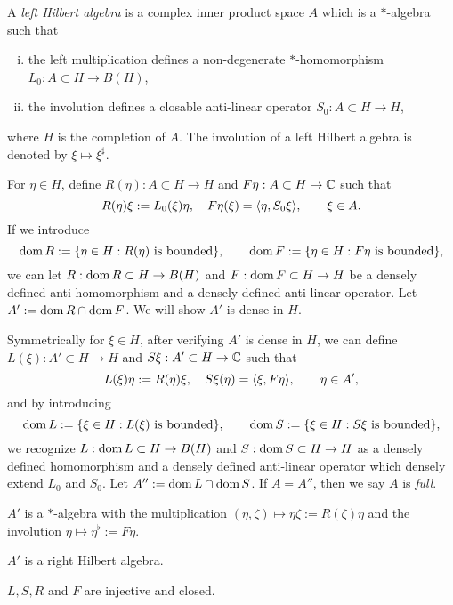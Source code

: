 \documentclass{../../large}
\begin{document}
\begin{prb}
A \emph{left Hilbert algebra} is a complex inner product space $A$ which is a $*$-algebra such that
\begin{enumerate}[(i)]
\item the left multiplication defines a non-degenerate $*$-homomorphism $L_0:A\subset H\to B(H)$,
\item the involution defines a closable anti-linear operator $S_0:A\subset H\to H$,
\end{enumerate}
where $H$ is the completion of $A$.
The involution of a left Hilbert algebra is denoted by $\xi\mapsto\xi^\sharp$.

For $\eta\in H$, define $R(\eta):A\subset H\to H$ and $F\eta:A\subset H\to\mathbb{C}$ such that
\[R(\eta)\xi:=L_0(\xi)\eta,\quad F\eta(\xi)=\langle\eta,S_0\xi\rangle,\qquad\xi\in A.\]
If we introduce
\[\operatorname{dom} R:=\{\eta\in H:R(\eta)\text{ is bounded}\},\qquad\operatorname{dom} F:=\{\eta\in H:F\eta\text{ is bounded}\},\]
we can let $R:\operatorname{dom} R\subset H\to B(H)$ and $F:\operatorname{dom} F\subset H\to H$ be a densely defined anti-homomorphism and a densely defined anti-linear operator.
Let $A':=\operatorname{dom} R\cap\operatorname{dom} F$.
We will show $A'$ is dense in $H$.

Symmetrically for $\xi\in H$, after verifying $A'$ is dense in $H$, we can define $L(\xi):A'\subset H\to H$ and $S\xi:A'\subset H\to\mathbb{C}$ such that
\[L(\xi)\eta:=R(\eta)\xi,\quad S\xi(\eta)=\langle\xi,F\eta\rangle,\qquad\eta\in A',\]
and by introducing
\[\operatorname{dom} L:=\{\xi\in H:L(\xi)\text{ is bounded}\},\qquad\operatorname{dom} S:=\{\xi\in H:S\xi\text{ is bounded}\},\]
we recognize $L:\operatorname{dom} L\subset H\to B(H)$ and $S:\operatorname{dom} S\subset H\to H$ as a densely defined homomorphism and a densely defined anti-linear operator which densely extend $L_0$ and $S_0$.
Let $A'':=\operatorname{dom} L\cap\operatorname{dom} S$.
If $A=A''$, then we say $A$ is \emph{full}.
\begin{parts}
\item $A'$ is a $*$-algebra with the multiplication $(\eta,\zeta)\mapsto\eta\zeta:=R(\zeta)\eta$ and the involution $\eta\mapsto\eta^\flat:=F\eta$.
\item $A'$ is a right Hilbert algebra.
\item $L,S,R$ and $F$ are injective and closed.
\end{parts}
\end{prb}
\end{document}
